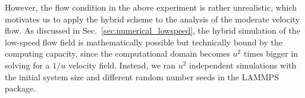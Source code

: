\documentclass[preprint,12pt]{elsarticle}
\begin{document}




However, the flow condition in the above experiment is rather unrealistic, which motivates us to apply the hybrid scheme to the analysis of the moderate velocity flow. As discussed in Sec.~\ref{sec:numerical_lowspeed}, the hybrid simulation of the low-speed flow field is mathematically possible but technically bound by the computing capacity, since the computational domain becomes $u^2$ times bigger in solving for a $1/u$ velocity field. Instead, we ran $u^2$ independent simulations with the initial system size and different random number seeds in the LAMMPS package.
\end{document}
